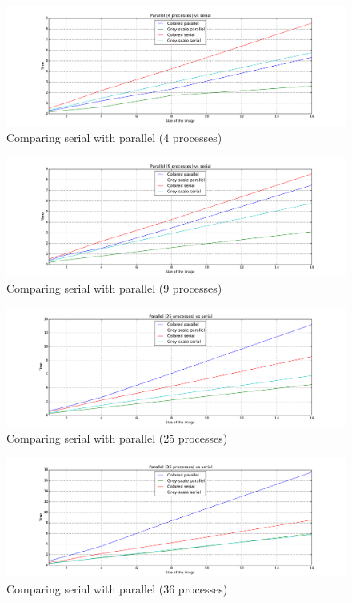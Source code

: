 \documentclass[11pt,a4paper,oneside]{article}
\begin{document}
\begin{figure}[h]
    \centering
    \includegraphics[width=\textwidth]{comp-4.pdf}
    \caption{Comparing serial with parallel (4 processes)}
\end{figure}

\begin{figure}[h]
    \centering
    \includegraphics[width=\textwidth]{comp-9.pdf}
    \caption{Comparing serial with parallel (9 processes)}
\end{figure}

\begin{figure}[h]
    \centering
    \includegraphics[width=\textwidth]{comp-25.pdf}
    \caption{Comparing serial with parallel (25 processes)}
\end{figure}

\begin{figure}[h]
    \centering
    \includegraphics[width=\textwidth]{comp-36.pdf}
    \caption{Comparing serial with parallel (36 processes)}
\end{figure}
\end{document}
